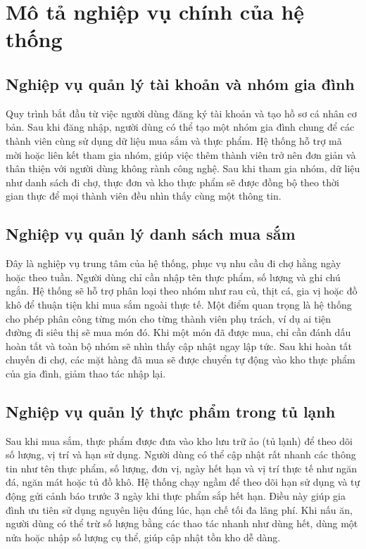 \documentclass[12pt,a4paper]{report}
\begin{document}
\section{Mô tả nghiệp vụ chính của hệ thống}

\subsection{Nghiệp vụ quản lý tài khoản và nhóm gia đình}
Quy trình bắt đầu từ việc người dùng đăng ký tài khoản và tạo hồ sơ cá nhân cơ bản. Sau khi đăng nhập, người dùng có thể tạo một nhóm gia đình chung để các thành viên cùng sử dụng dữ liệu mua sắm và thực phẩm.  
Hệ thống hỗ trợ mã mời hoặc liên kết tham gia nhóm, giúp việc thêm thành viên trở nên đơn giản và thân thiện với người dùng không rành công nghệ.  
Sau khi tham gia nhóm, dữ liệu như danh sách đi chợ, thực đơn và kho thực phẩm sẽ được đồng bộ theo thời gian thực để mọi thành viên đều nhìn thấy cùng một thông tin.  

\subsection{Nghiệp vụ quản lý danh sách mua sắm}
Đây là nghiệp vụ trung tâm của hệ thống, phục vụ nhu cầu đi chợ hằng ngày hoặc theo tuần.  
Người dùng chỉ cần nhập tên thực phẩm, số lượng và ghi chú ngắn. Hệ thống sẽ hỗ trợ phân loại theo nhóm như rau củ, thịt cá, gia vị hoặc đồ khô để thuận tiện khi mua sắm ngoài thực tế.  
Một điểm quan trọng là hệ thống cho phép phân công từng món cho từng thành viên phụ trách, ví dụ ai tiện đường đi siêu thị sẽ mua món đó. Khi một món đã được mua, chỉ cần đánh dấu hoàn tất và toàn bộ nhóm sẽ nhìn thấy cập nhật ngay lập tức.  
Sau khi hoàn tất chuyến đi chợ, các mặt hàng đã mua sẽ được chuyển tự động vào kho thực phẩm của gia đình, giảm thao tác nhập lại.  

\subsection{Nghiệp vụ quản lý thực phẩm trong tủ lạnh}
Sau khi mua sắm, thực phẩm được đưa vào kho lưu trữ ảo (tủ lạnh) để theo dõi số lượng, vị trí và hạn sử dụng.  
Người dùng có thể cập nhật rất nhanh các thông tin như tên thực phẩm, số lượng, đơn vị, ngày hết hạn và vị trí thực tế như ngăn đá, ngăn mát hoặc tủ đồ khô.  
Hệ thống chạy ngầm để theo dõi hạn sử dụng và tự động gửi cảnh báo trước 3 ngày khi thực phẩm sắp hết hạn. Điều này giúp gia đình ưu tiên sử dụng nguyên liệu đúng lúc, hạn chế tối đa lãng phí.  
Khi nấu ăn, người dùng có thể trừ số lượng bằng các thao tác nhanh như dùng hết, dùng một nửa hoặc nhập số lượng cụ thể, giúp cập nhật tồn kho dễ dàng.  
\end{document}
